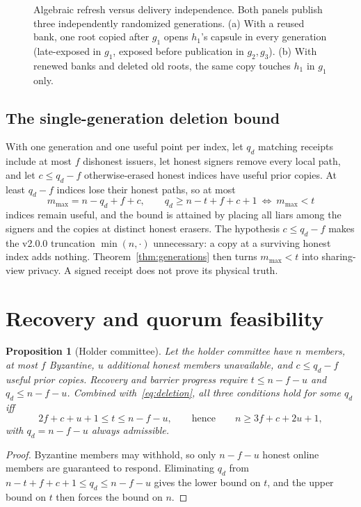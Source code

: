 \documentclass[pdflatex,sn-mathphys-num]{sn-jnl}
\theoremstyle{plain}
\newtheorem{proposition}[theorem]{Proposition}
\theoremstyle{definition}
\begin{document}
\begin{figure}[htbp]
\centering
\resizebox{\linewidth}{!}{}
\caption{Algebraic refresh versus delivery independence. Both panels publish three independently randomized generations. (a) With a reused bank, one root copied after $g_1$ opens $h_1$'s capsule in every generation (late-exposed in $g_1$, exposed before publication in $g_2,g_3$). (b) With renewed banks and deleted old roots, the same copy touches $h_1$ in $g_1$ only.}\label{fig:reuse}
\end{figure}

\subsection{The single-generation deletion bound}
With one generation and one useful point per index, let $q_d$ matching receipts include at most $f$ dishonest issuers, let honest signers remove every local path, and let $c\le q_d-f$ otherwise-erased honest indices have useful prior copies. At least $q_d-f$ indices lose their honest paths, so at most
\begin{equation}\label{eq:deletion}
 m_{\max}=n-q_d+f+c,\qquad
 q_d\ge n-t+f+c+1\ \Longleftrightarrow\ m_{\max}<t
\end{equation}
indices remain useful, and the bound is attained by placing all liars among the signers and the copies at distinct honest erasers. The hypothesis $c\le q_d-f$ makes the v2.0.0 truncation $\min(n,\cdot)$ unnecessary: a copy at a surviving honest index adds nothing. Theorem~\ref{thm:generations} then turns $m_{\max}<t$ into sharing-view privacy. A signed receipt does not prove its physical truth.


\section{Recovery and quorum feasibility}\label{sec:quorum}

\begin{proposition}[Holder committee]\label{prop:holders}
Let the holder committee have $n$ members, at most $f$ Byzantine, $u$ additional honest members unavailable, and $c\le q_d-f$ useful prior copies. Recovery and barrier progress require $t\le n-f-u$ and $q_d\le n-f-u$. Combined with~\eqref{eq:deletion}, all three conditions hold for some $q_d$ iff
\begin{equation}\label{eq:feasible}
 2f+c+u+1\le t\le n-f-u,\qquad\text{hence}\qquad n\ge3f+c+2u+1,
\end{equation}
with $q_d=n-f-u$ always admissible.
\end{proposition}
\begin{proof}
Byzantine members may withhold, so only $n-f-u$ honest online members are guaranteed to respond. Eliminating $q_d$ from $n-t+f+c+1\le q_d\le n-f-u$ gives the lower bound on $t$, and the upper bound on $t$ then forces the bound on $n$.
\end{proof}
\end{document}
